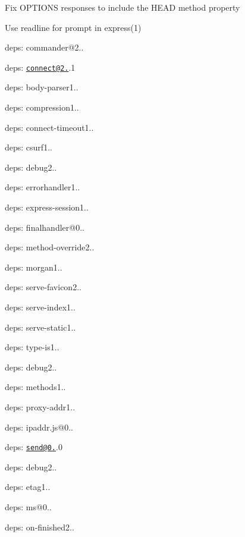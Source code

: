 \begin{DoxyItemize}
\item Fix {\ttfamily O\+P\+T\+I\+O\+N\+S} responses to include the {\ttfamily H\+E\+A\+D} method property
\item Use {\ttfamily readline} for prompt in {\ttfamily express(1)}
\item deps\+: commander@2..
\item deps\+: \href{mailto:connect@2.28}{\tt connect@2.}.1
\begin{DoxyItemize}
\item deps\+: body-\/parser1..
\item deps\+: compression1..
\item deps\+: connect-\/timeout1..
\item deps\+: csurf1..
\item deps\+: debug2..
\item deps\+: errorhandler1..
\item deps\+: express-\/session1..
\item deps\+: finalhandler@0..
\item deps\+: method-\/override2..
\item deps\+: morgan1..
\item deps\+: serve-\/favicon2..
\item deps\+: serve-\/index1..
\item deps\+: serve-\/static1..
\item deps\+: type-\/is1..
\end{DoxyItemize}
\item deps\+: debug2..
\item deps\+: methods1..
\item deps\+: proxy-\/addr1..
\begin{DoxyItemize}
\item deps\+: ipaddr.\+js@0..
\end{DoxyItemize}
\item deps\+: \href{mailto:send@0.11}{\tt send@0.}.0
\begin{DoxyItemize}
\item deps\+: debug2..
\item deps\+: etag1..
\item deps\+: ms@0..
\item deps\+: on-\/finished2..
\end{DoxyItemize}
\end{DoxyItemize}

